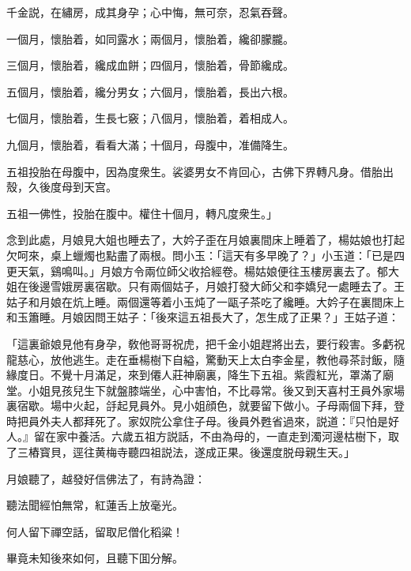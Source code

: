 \begin{myquote}
千金説，在繡房，成其身孕；心中悔，無可奈，忍氣吞聲。

一個月，懷胎着，如同露水；兩個月，懷胎着，纔卻朦朧。

三個月，懷胎着，纔成血餅；四個月，懷胎着，骨節纔成。

五個月，懷胎着，纔分男女；六個月，懷胎着，長出六根。

七個月，懷胎着，生長七竅；八個月，懷胎着，着相成人。

九個月，懷胎着，看看大滿；十個月，母腹中，准備降生。

五祖投胎在母腹中，因為度衆生。裟婆男女不肯回心，古佛下界轉凡身。借胎出殼，久後度母到天宫。

\hspace*{4em}

五祖一佛性，投胎在腹中。權住十個月，轉凡度衆生。」
\end{myquote}

念到此處，月娘見大姐也睡去了，大妗子歪在月娘裏間床上睡着了，楊姑娘也打起欠呵來，桌上蠟燭也點盡了兩根。問小玉：「這天有多早晚了？」小玉道：「已是四更天氣，鷄鳴叫。」月娘方令兩位師父收拾經卷。楊姑娘便往玉樓房裏去了。郁大姐在後邊雪娥房裏宿歇。只有兩個姑子，月娘打發大師父和李嬌兒一處睡去了。王姑子和月娘在炕上睡。兩個還等着小玉炖了一甌子茶吃了纔睡。大妗子在裏間床上和玉簫睡。月娘因問王姑子：「後來這五祖長大了，怎生成了正果？」王姑子道：

「這裏爺娘見他有身孕，敎他哥哥祝虎，把千金小姐趕將出去，要行殺害。多虧祝龍慈心，放他逃生。走在垂楊樹下自縊，驚動天上太白李金星，教他尋茶討飯，隨緣度日。不覺十月滿足，來到僊人莊神廟裏，降生下五祖。紫霞紅光，罩滿了廟堂。小姐見孩兒生下就盤膝端坐，心中害怕，不比尋常。後又到天喜村王員外家場裏宿歇。場中火起，㧱起見員外。見小姐顔色，就要留下做小。子母兩個下拜，登時把員外夫人都拜死了。家奴院公拿住子母。後員外甦省過來，説道：『只怕是好人。』留在家中養活。六歲五祖方説話，不由為母的，一直走到濁河邊枯樹下，取了三樁寳貝，逕往黄梅寺聽四祖説法，遂成正果。後還度脱母親生天。」

月娘聽了，越發好信佛法了，有詩為證：

\begin{myquote}
聽法聞經怕無常，紅蓮舌上放毫光。

何人留下禪空話，留取尼僧化稻粱！
\end{myquote}

畢竟未知後來如何，且聽下囬分解。

